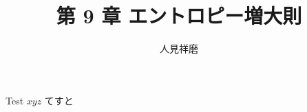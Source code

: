 \documentclass[aspectratio=149]{beamer}
\author{人見祥磨}
\title{第 9 章 エントロピー増大則}
\begin{document}
\begin{frame}
	\maketitle
\end{frame}

\begin{frame}
	Test \(xyz\)
	てすと
\end{frame}
\end{document}
